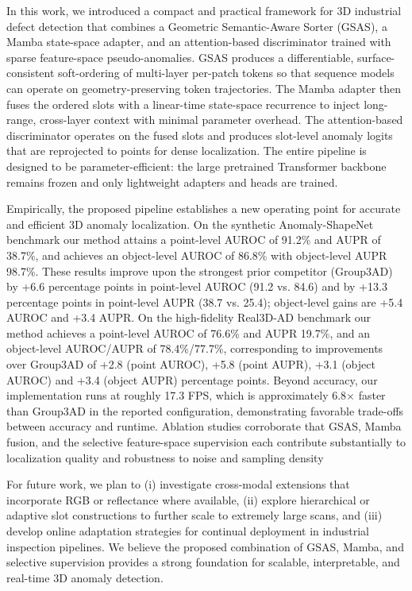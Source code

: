 In this work, we introduced a compact and practical framework for 3D industrial defect detection that combines a Geometric Semantic-Aware Sorter (GSAS), a Mamba state-space adapter, and an attention-based discriminator trained with sparse feature-space pseudo-anomalies. GSAS produces a differentiable, surface-consistent soft-ordering of multi-layer per-patch tokens so that sequence models can operate on geometry-preserving token trajectories. The Mamba adapter then fuses the ordered slots with a linear-time state-space recurrence to inject long-range, cross-layer context with minimal parameter overhead. The attention-based discriminator operates on the fused slots and produces slot-level anomaly logits that are reprojected to points for dense localization. The entire pipeline is designed to be parameter-efficient: the large pretrained Transformer backbone remains frozen and only lightweight adapters and heads are trained.

Empirically, the proposed pipeline establishes a new operating point for accurate and efficient 3D anomaly localization. On the synthetic Anomaly-ShapeNet benchmark our method attains a point-level AUROC of 91.2\% and AUPR of 38.7\%, and achieves an object-level AUROC of 86.8\% with object-level AUPR 98.7\%. These results improve upon the strongest prior competitor (Group3AD) by +6.6 percentage points in point-level AUROC (91.2 vs. 84.6) and by +13.3 percentage points in point-level AUPR (38.7 vs. 25.4); object-level gains are +5.4 AUROC and +3.4 AUPR. On the high-fidelity Real3D-AD benchmark our method achieves a point-level AUROC of 76.6\% and AUPR 19.7\%, and an object-level AUROC/AUPR of 78.4\%/77.7\%, corresponding to improvements over Group3AD of +2.8 (point AUROC), +5.8 (point AUPR), +3.1 (object AUROC) and +3.4 (object AUPR) percentage points. Beyond accuracy, our implementation runs at roughly 17.3 FPS, which is approximately 6.8$\times$ faster than Group3AD in the reported configuration, demonstrating favorable trade-offs between accuracy and runtime. Ablation studies corroborate that GSAS, Mamba fusion, and the selective feature-space supervision each contribute substantially to localization quality and robustness to noise and sampling density

For future work, we plan to (i) investigate cross-modal extensions that incorporate RGB or reflectance where available, (ii) explore hierarchical or adaptive slot constructions to further scale to extremely large scans, and (iii) develop online adaptation strategies for continual deployment in industrial inspection pipelines. We believe the proposed combination of GSAS, Mamba, and selective supervision provides a strong foundation for scalable, interpretable, and real-time 3D anomaly detection.
